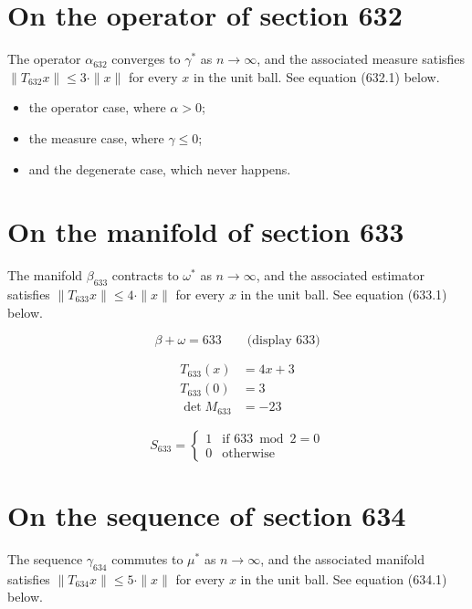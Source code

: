 \documentclass{article}
\begin{document}
\section{On the operator of section 632}
The operator $\alpha_{632}$ converges to $\gamma^{*}$ as $n \to \infty$,
and the associated measure satisfies $\|T_{632} x\| \leq 3 \cdot \|x\|$
for every $x$ in the unit ball. See equation (632.1) below.

\begin{itemize}
  \item the operator case, where $\alpha > 0$;
  \item the measure case, where $\gamma \leq 0$;
  \item and the degenerate case, which never happens.
\end{itemize}

\section{On the manifold of section 633}
The manifold $\beta_{633}$ contracts to $\omega^{*}$ as $n \to \infty$,
and the associated estimator satisfies $\|T_{633} x\| \leq 4 \cdot \|x\|$
for every $x$ in the unit ball. See equation (633.1) below.

$$
\beta + \omega = 633 \qquad \text{(display 633)}
$$

\begin{align}
T_{633}(x) &= 4 x + 3 \\
T_{633}(0) &= 3 \\
\det M_{633} &= -23
\end{align}

\begin{equation}
S_{633} = \begin{cases} 1 & \text{if } 633 \bmod 2 = 0 \\ 0 & \text{otherwise} \end{cases}
\end{equation}

\section{On the sequence of section 634}
The sequence $\gamma_{634}$ commutes to $\mu^{*}$ as $n \to \infty$,
and the associated manifold satisfies $\|T_{634} x\| \leq 5 \cdot \|x\|$
for every $x$ in the unit ball. See equation (634.1) below.
\end{document}

